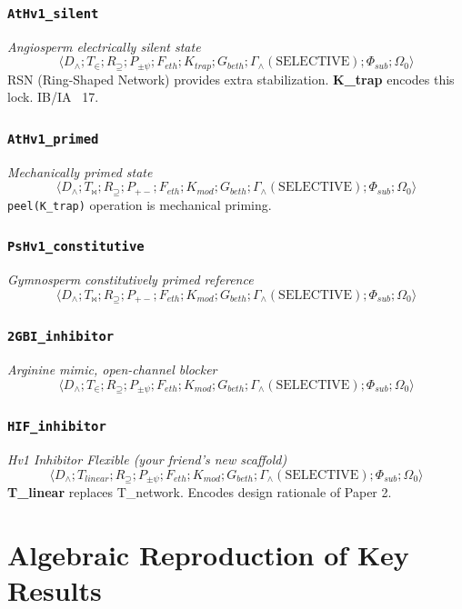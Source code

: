 \documentclass[11pt, a4paper]{article}
\begin{document}
\subsubsection*{\texttt{AtHv1\_silent}}
\textit{Angiosperm electrically silent state}
\[
\langle D_\wedge; T_\in; R_\supseteq; P_{\pm\psi}; F_{eth}; K_{trap}; G_{beth}; \Gamma_\wedge(\text{SELECTIVE}); \Phi_{sub}; \Omega_0 \rangle
\]
RSN (Ring-Shaped Network) provides extra stabilization. \textbf{K\_trap} encodes this lock. IB/IA ~17.

\subsubsection*{\texttt{AtHv1\_primed}}
\textit{Mechanically primed state}
\[
\langle D_\wedge; T_\bowtie; R_\supseteq; P_{+-}; F_{eth}; K_{mod}; G_{beth}; \Gamma_\wedge(\text{SELECTIVE}); \Phi_{sub}; \Omega_0 \rangle
\]
\texttt{peel(K\_trap)} operation is mechanical priming.

\subsubsection*{\texttt{PsHv1\_constitutive}}
\textit{Gymnosperm constitutively primed reference}
\[
\langle D_\wedge; T_\bowtie; R_\supseteq; P_{+-}; F_{eth}; K_{mod}; G_{beth}; \Gamma_\wedge(\text{SELECTIVE}); \Phi_{sub}; \Omega_0 \rangle
\]

\subsubsection*{\texttt{2GBI\_inhibitor}}
\textit{Arginine mimic, open-channel blocker}
\[
\langle D_\wedge; T_\in; R_\supseteq; P_{\pm\psi}; F_{eth}; K_{mod}; G_{beth}; \Gamma_\wedge(\text{SELECTIVE}); \Phi_{sub}; \Omega_0 \rangle
\]

\subsubsection*{\texttt{HIF\_inhibitor}}
\textit{Hv1 Inhibitor Flexible (your friend's new scaffold)}
\[
\langle D_\wedge; T_{linear}; R_\supseteq; P_{\pm\psi}; F_{eth}; K_{mod}; G_{beth}; \Gamma_\wedge(\text{SELECTIVE}); \Phi_{sub}; \Omega_0 \rangle
\]
\textbf{T\_linear} replaces T\_network. Encodes design rationale of Paper 2.

\section{Algebraic Reproduction of Key Results}
\end{document}
